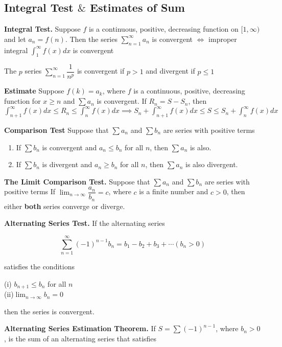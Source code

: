 \subsection{Integral Test $\&$ Estimates of Sum}


\textbf{Integral Test.} Suppose $f$ is a continuous, positive, decreasing function on $[1,\infty )$ and let $a_n = f(n)$. Then the series $\sum^{\infty}_{n = 1}a_n$ is convergent $\Leftrightarrow$ improper integral $\int^{\infty}_{1}f(x)dx$ is convergent


\begin{rmk*}
	The $p$ series $\sum^{\infty}_{n = 1} \dfrac{1}{n^p}$ is convergent if $p > 1$ and divergent if $p \leq 1$	
\end{rmk*}

\textbf{Estimate} Suppose $f(k) = a_k$, where $f$ is a continuous, positive, decreasing function for $x \geq n$ and $\sum a_n$ is convergent. If $R_n = S - S_n$, then $\int^{\infty}_{n+1}f(x)dx \leq R_n \leq \int^{\infty}_{n}f(x)dx \implies S_n + \int^{\infty}_{n+1}f(x)dx \leq S \leq S_n + \int^{\infty}_{n}f(x)dx$

\textbf{Comparison Test} Suppose that $\sum a_n$ and $\sum b_n$ are series with positive terms

\begin{enumerate}
	\item If $\sum b_n$ is convergent and $a_n \leq b_n$ for all $n$, then $\sum a_n$ is also.
	\item If $\sum b_n$ is divergent and $a_n \geq b_n$ for all $n$, then $\sum a_n$ is also divergent.	
\end{enumerate}

\textbf{The Limit Comparison Test.} Suppose that $\sum a_n$ and $\sum b_n$ are series with positive terms If $\lim_{n \rightarrow \infty}\dfrac{a_n}{b_n} = c$, where $c$ is a finite number and $c > 0$, then either \textbf{both} series converge or diverge.

\textbf{Alternating Series Test.} If the alternating series

$$\sum^{\infty}_{n = 1}(-1)^{n-1}b_n = b_1 - b_2 + b_3 + \cdots (b_n > 0)$$

satisfies the conditions

(i) $b_{n+1} \leq b_n$ for all $n$\\
(ii)$\lim_{n \rightarrow \infty}b_n = 0$

then the series is convergent.


\textbf{Alternating Series Estimation Theorem.} If $S = \sum (-1)^{n - 1}$, where $b_n > 0$, is the sum of an alternating series that satisfies

